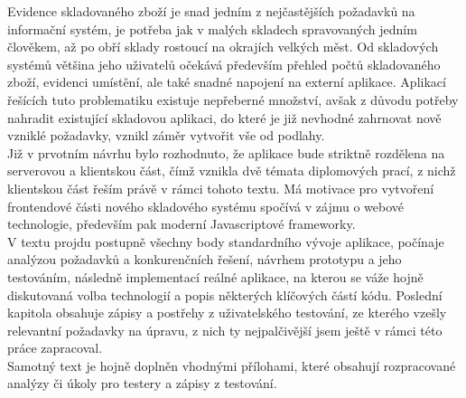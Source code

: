 Evidence skladovaného zboží je snad jedním z nejčastějších požadavků na informační systém, je potřeba jak v malých skladech spravovaných jedním člověkem, až po obří sklady rostoucí na okrajích velkých měst. Od skladových systémů většina jeho uživatelů očekává především přehled počtů skladovaného zboží, evidenci umístění, ale také snadné napojení na externí aplikace. Aplikací řešících tuto problematiku existuje nepřeberné množství, avšak z důvodu potřeby nahradit existující skladovou aplikaci, do které je již nevhodné zahrnovat nově vzniklé požadavky, vznikl záměr vytvořit vše od podlahy.\\
Již v prvotním návrhu bylo rozhodnuto, že aplikace bude striktně rozdělena na serverovou a klientskou část, čímž vznikla dvě témata diplomových prací, z nichž klientskou část řeším právě v rámci tohoto textu. Má motivace pro vytvoření frontendové části nového skladového systému spočívá v zájmu o webové technologie, především pak moderní Javascriptové frameworky.\\
V textu projdu postupně všechny body standardního vývoje aplikace, počínaje analýzou požadavků a konkurenčních řešení, návrhem prototypu a jeho testováním, následně implementací reálné aplikace, na kterou se váže hojně diskutovaná volba technologií a popis některých klíčových částí kódu. Poslední kapitola obsahuje zápisy a postřehy z uživatelského testování, ze kterého vzešly relevantní požadavky na úpravu, z nich ty nejpalčivější jsem ještě v rámci této práce zapracoval.\\
Samotný text je hojně doplněn vhodnými přílohami, které obsahují rozpracované analýzy či úkoly pro testery a zápisy z testování.
